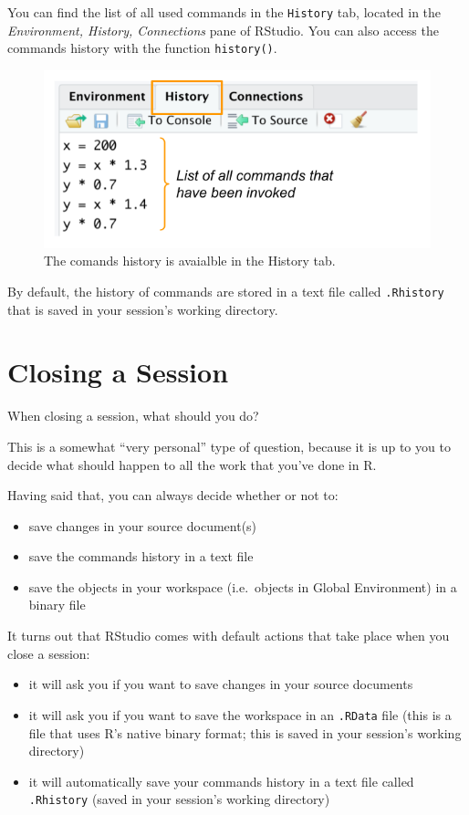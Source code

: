 \documentclass[
]{book}
\begin{document}
You can find the list of all used commands in the \texttt{History} tab,
located in the \emph{Environment, History, Connections} pane of RStudio. You can
also access the commands history with the function \texttt{history()}.

\begin{figure}

{\centering \includegraphics[width=0.65\linewidth]{images/rstudio/rstudio-history-tab} 

}

\caption{The comands history is avaialble in the History tab.}\label{fig:unnamed-chunk-33}
\end{figure}

By default, the history of commands are stored in a text file called \texttt{.Rhistory}
that is saved in your session's working directory.

\hypertarget{closing-a-session}{%
\section{Closing a Session}\label{closing-a-session}}

When closing a session, what should you do?

This is a somewhat ``very personal'' type of question, because it is up to you to
decide what should happen to all the work that you've done in R.

Having said that, you can always decide whether or not to:

\begin{itemize}
\item
  save changes in your source document(s)
\item
  save the commands history in a text file
\item
  save the objects in your workspace (i.e.~objects in Global Environment) in
  a binary file
\end{itemize}

It turns out that RStudio comes with default actions that take place
when you close a session:

\begin{itemize}
\item
  it will ask you if you want to save changes in your source documents
\item
  it will ask you if you want to save the workspace in an \texttt{.RData} file
  (this is a file that uses R's native binary format; this is saved in your
  session's working directory)
\item
  it will automatically save your commands history in a text file called
  \texttt{.Rhistory} (saved in your session's working directory)
\end{itemize}
\end{document}
